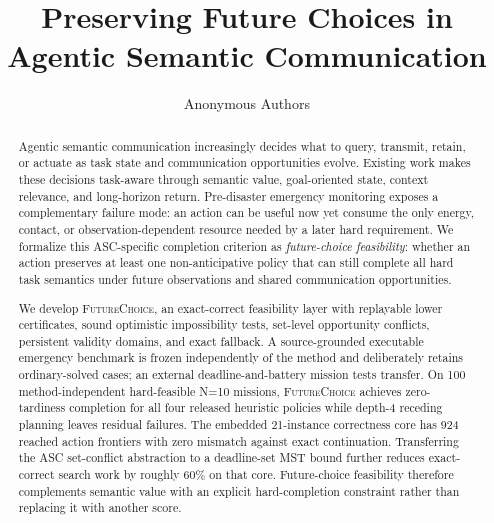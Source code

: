 \documentclass[conference]{IEEEtran}
\title{Preserving Future Choices in Agentic Semantic Communication}
\author{Anonymous Authors}
\newcommand{\futurechoice}{\textsc{FutureChoice}\xspace}
\begin{document}
\maketitle

\begin{abstract}
Agentic semantic communication increasingly decides what to query, transmit, retain, or actuate as task state and communication opportunities evolve. Existing work makes these decisions task-aware through semantic value, goal-oriented state, context relevance, and long-horizon return. Pre-disaster emergency monitoring exposes a complementary failure mode: an action can be useful now yet consume the only energy, contact, or observation-dependent resource needed by a later hard requirement. We formalize this ASC-specific completion criterion as \emph{future-choice feasibility}: whether an action preserves at least one non-anticipative policy that can still complete all hard task semantics under future observations and shared communication opportunities.

We develop \futurechoice, an exact-correct feasibility layer with replayable lower certificates, sound optimistic impossibility tests, set-level opportunity conflicts, persistent validity domains, and exact fallback. A source-grounded executable emergency benchmark is frozen independently of the method and deliberately retains ordinary-solved cases; an external deadline-and-battery mission tests transfer. On 100 method-independent hard-feasible N=10 missions, \futurechoice achieves zero-tardiness completion for all four released heuristic policies while depth-4 receding planning leaves residual failures. The embedded 21-instance correctness core has 924 reached action frontiers with zero mismatch against exact continuation. Transferring the ASC set-conflict abstraction to a deadline-set MST bound further reduces exact-correct search work by roughly 60\% on that core. Future-choice feasibility therefore complements semantic value with an explicit hard-completion constraint rather than replacing it with another score.
\end{abstract}
\end{document}
